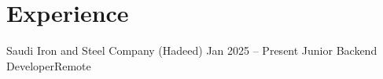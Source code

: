 \section{Experience}
\resumeSubHeadingListStart

    \resumeSubheading
    {Saudi Iron and Steel Company (Hadeed)} {Jan 2025 -- Present}
    {Junior Backend Developer}{Remote}
    
    

\resumeSubHeadingListEnd
